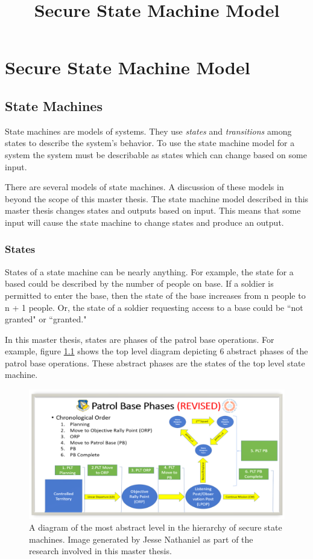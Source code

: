 \documentclass[../../main/main.tex]{subfiles}
\begin{document}
\title{Secure State Machine Model}

\chapter{Secure State Machine Model}\label{chp:ssmmodel}

\section{State Machines}\label{sec:sm}
State machines are models of systems.  They use \textit{states} and \textit{transitions} among states to describe the system's behavior.  To use the state machine model for a system the system must be describable as states which can change based on some input.    

There are several models of state machines.  A discussion of these models in beyond the scope of this master thesis.  The state machine model described in this master thesis changes states and outputs based on input.  This means that some input will cause the state machine to change states and produce an output.

\subsection{States}
States of a state machine can be nearly anything.  For example, the state for a based could be described by the number of people on base.  If a soldier is permitted to enter the base, then the state of the base increases from n people to n + 1 people. Or, the state of a soldier requesting access to a base could be ``not granted" or ``granted."

In this master thesis, states are phases of the patrol base operations.  For example, figure \ref{pbtoplevel2} shows the top level diagram depicting 6 abstract phases of the patrol base operations.  These abstract phases are the states of the top level state machine.

\begin{figure}[h]
\includegraphics[width=\textwidth]{../figures/pbtoplevel}
\caption{\label{pbtoplevel2}A diagram of the most abstract level in the hierarchy of secure state machines.  Image generated by Jesse Nathaniel as part of the research involved in this master thesis.}
\end{figure}
\end{document}
